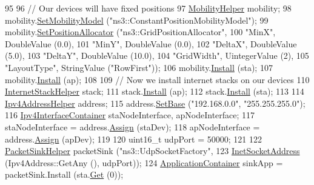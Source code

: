 \begin{DoxyCode}
95 
96   \textcolor{comment}{// Our devices will have fixed positions}
97   \hyperlink{classns3_1_1MobilityHelper}{MobilityHelper} mobility;
98   mobility.\hyperlink{classns3_1_1MobilityHelper_a030275011b6f40682e70534d30280aba}{SetMobilityModel} (\textcolor{stringliteral}{"ns3::ConstantPositionMobilityModel"});
99   mobility.\hyperlink{classns3_1_1MobilityHelper_ac59d5295076be3cc11021566713a28c5}{SetPositionAllocator} (\textcolor{stringliteral}{"ns3::GridPositionAllocator"},
100                                  \textcolor{stringliteral}{"MinX"}, DoubleValue (0.0),
101                                  \textcolor{stringliteral}{"MinY"}, DoubleValue (0.0),
102                                  \textcolor{stringliteral}{"DeltaX"}, DoubleValue (5.0),
103                                  \textcolor{stringliteral}{"DeltaY"}, DoubleValue (10.0),
104                                  \textcolor{stringliteral}{"GridWidth"}, UintegerValue (2),
105                                  \textcolor{stringliteral}{"LayoutType"}, StringValue (\textcolor{stringliteral}{"RowFirst"}));
106   mobility.\hyperlink{classns3_1_1MobilityHelper_a07737960ee95c0777109cf2994dd97ae}{Install} (sta);
107   mobility.\hyperlink{classns3_1_1MobilityHelper_a07737960ee95c0777109cf2994dd97ae}{Install} (ap);
108 
109   \textcolor{comment}{// Now we install internet stacks on our devices}
110   \hyperlink{classns3_1_1InternetStackHelper}{InternetStackHelper} stack;
111   stack.\hyperlink{classns3_1_1InternetStackHelper_a6645b412f31283d2d9bc3d8a95cebbc0}{Install} (ap);
112   stack.\hyperlink{classns3_1_1InternetStackHelper_a6645b412f31283d2d9bc3d8a95cebbc0}{Install} (sta);
113 
114   \hyperlink{classns3_1_1Ipv4AddressHelper}{Ipv4AddressHelper} address;
115   address.\hyperlink{classns3_1_1Ipv4AddressHelper_acf7b16dd25bac67e00f5e25f90a9a035}{SetBase} (\textcolor{stringliteral}{"192.168.0.0"}, \textcolor{stringliteral}{"255.255.255.0"});
116   \hyperlink{classns3_1_1Ipv4InterfaceContainer}{Ipv4InterfaceContainer} staNodeInterface, apNodeInterface;
117   staNodeInterface = address.\hyperlink{classns3_1_1Ipv4AddressHelper_af8e7f4a1a7e74c00014a1eac445a27af}{Assign} (staDev);
118   apNodeInterface = address.\hyperlink{classns3_1_1Ipv4AddressHelper_af8e7f4a1a7e74c00014a1eac445a27af}{Assign} (apDev);
119 
120   uint16\_t udpPort = 50000;
121 
122   \hyperlink{classns3_1_1PacketSinkHelper}{PacketSinkHelper} packetSink (\textcolor{stringliteral}{"ns3::UdpSocketFactory"},
123                                \hyperlink{classns3_1_1InetSocketAddress}{InetSocketAddress} (Ipv4Address::GetAny (), udpPort));
124   \hyperlink{classns3_1_1ApplicationContainer}{ApplicationContainer} sinkApp = packetSink.Install (sta.\hyperlink{classns3_1_1NodeContainer_a9ed96e2ecc22e0f5a3d4842eb9bf90bf}{Get} (0));

\end{DoxyCode}
